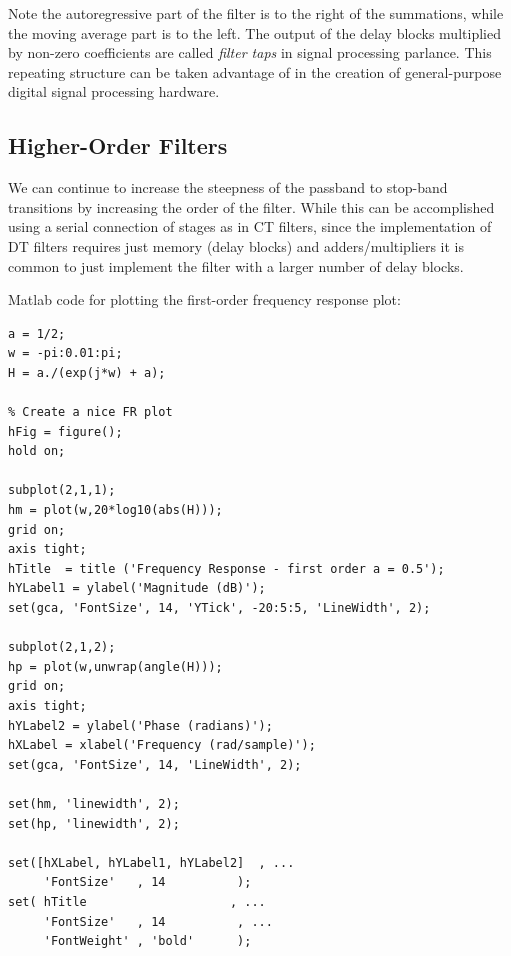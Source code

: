 \begin{example}
Note the autoregressive part of the filter is to the right of the summations, while the moving average part is to the left. The output of the delay blocks multiplied by non-zero coefficients are called \emph{filter taps} in signal processing parlance. This repeating structure can be taken advantage of in the creation of general-purpose digital signal processing hardware.
\end{example}

\subsection{Higher-Order Filters}

We can continue to increase the steepness of the passband to stop-band transitions by increasing the order of the filter. While this can be accomplished using a serial connection of stages as in CT filters, since the implementation of DT filters requires just memory (delay blocks) and adders/multipliers it is common to just implement the filter with a larger number of delay blocks. 

\newpage
Matlab code for plotting the first-order frequency response plot:
\begin{verbatim}
a = 1/2;
w = -pi:0.01:pi;
H = a./(exp(j*w) + a);

% Create a nice FR plot 
hFig = figure();
hold on;

subplot(2,1,1);
hm = plot(w,20*log10(abs(H)));
grid on;
axis tight;
hTitle  = title ('Frequency Response - first order a = 0.5');
hYLabel1 = ylabel('Magnitude (dB)');
set(gca, 'FontSize', 14, 'YTick', -20:5:5, 'LineWidth', 2);

subplot(2,1,2);
hp = plot(w,unwrap(angle(H)));
grid on;
axis tight;
hYLabel2 = ylabel('Phase (radians)');
hXLabel = xlabel('Frequency (rad/sample)');
set(gca, 'FontSize', 14, 'LineWidth', 2);

set(hm, 'linewidth', 2);
set(hp, 'linewidth', 2);

set([hXLabel, hYLabel1, hYLabel2]  , ...
     'FontSize'   , 14          );
set( hTitle                    , ...
     'FontSize'   , 14          , ...
     'FontWeight' , 'bold'      );
\end{verbatim}

